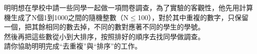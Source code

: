 明明想在學校中請一些同學一起做一項問卷調查，為了實驗的客觀性，他先用計算機生成了N個1到1000之間的隨機整數（N$\leq$100），對於其中重複的數字，只保留一個，把其餘相同的數去掉，不同的數對應著不同的學生的學號。 \\
然後再把這些數從小到大排序，按照排好的順序去找同學做調查。 \\
請你協助明明完成“去重複”與“排序”的工作。 \\